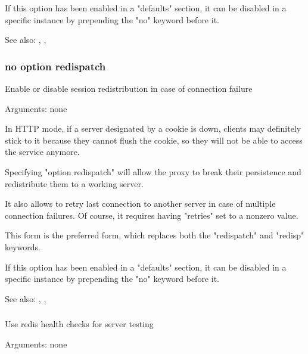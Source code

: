   If this option has been enabled in a "defaults" section, it can be disabled
  in a specific instance by prepending the "no" keyword before it.


See also: , , 

\subsubsection[redispatch]{}
\subsubsection*{no option redispatch}


  Enable or disable session redistribution in case of connection failure


  Arguments: none

  In HTTP mode, if a server designated by a cookie is down, clients may
  definitely stick to it because they cannot flush the cookie, so they will not
  be able to access the service anymore.

  Specifying "option redispatch" will allow the proxy to break their
  persistence and redistribute them to a working server.

  It also allows to retry last connection to another server in case of multiple
  connection failures. Of course, it requires having "retries" set to a nonzero
  value.

  This form is the preferred form, which replaces both the "redispatch" and
  "redisp" keywords.

  If this option has been enabled in a "defaults" section, it can be disabled
  in a specific instance by prepending the "no" keyword before it.


See also: , , 

\subsubsection[redis-check]{}


  Use redis health checks for server testing


  Arguments: none

